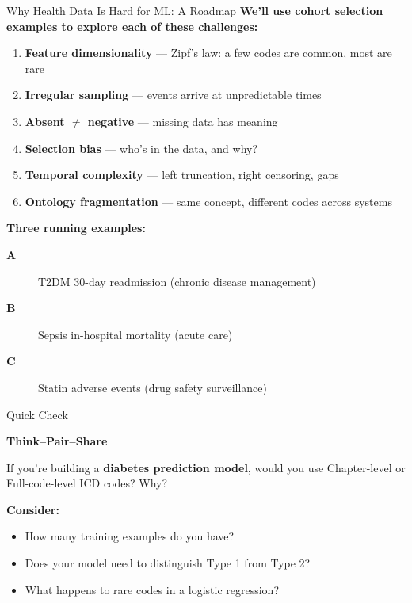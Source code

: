\documentclass[aspectratio=169,10pt]{beamer}
\begin{document}
\begin{frame}{Why Health Data Is Hard for ML: A Roadmap}
\textbf{We'll use cohort selection examples to explore each of these challenges:}
\vspace{0.5em}
\begin{enumerate}[<+->]
    \item \textbf{Feature dimensionality} --- Zipf's law: a few codes are common, most are rare
    \item \textbf{Irregular sampling} --- events arrive at unpredictable times
    \item \textbf{Absent $\neq$ negative} --- missing data has meaning
    \item \textbf{Selection bias} --- who's in the data, and why?
    \item \textbf{Temporal complexity} --- left truncation, right censoring, gaps
    \item \textbf{Ontology fragmentation} --- same concept, different codes across systems
\end{enumerate}
\pause
\vspace{0.5em}
\textbf{Three running examples:}
\begin{description}
    \item[\color{columbia}\textbf{A}] T2DM 30-day readmission (chronic disease management)
    \item[\color{columbiaaccent}\textbf{B}] Sepsis in-hospital mortality (acute care)
    \item[\color{columbiagray}\textbf{C}] Statin adverse events (drug safety surveillance)
\end{description}
\end{frame}

\begin{frame}{Quick Check}
\begin{center}
\Large\textbf{Think--Pair--Share}
\end{center}

\vspace{0.8em}
If you're building a \textbf{diabetes prediction model}, would you use Chapter-level or Full-code-level ICD codes? Why?

\vspace{0.8em}
\textbf{Consider:}
\begin{itemize}
    \item How many training examples do you have?
    \item Does your model need to distinguish Type 1 from Type 2?
    \item What happens to rare codes in a logistic regression?
\end{itemize}
\end{frame}
\end{document}
